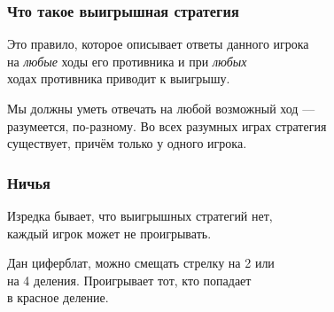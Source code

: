 \begin{frame} \frametitle{Что такое выигрышная стратегия}
	Это правило, которое описывает ответы данного игрока \\
	на {\it любые} ходы его противника и при {\it любых} \\
	ходах противника приводит к выигрышу. \bigskip
	
	Мы должны уметь отвечать на любой возможный ход — \\
	разумеется, по-разному. Во всех разумных играх стратегия \\
	существует, причём только у одного игрока.
\end{frame}

\begin{frame} \frametitle{Ничья}
	Изредка бывает, что выигрышных стратегий нет, \\
	каждый игрок может не проигрывать. \medskip

\begin{center}  \end{center} \medskip

	Дан циферблат, можно смещать стрелку на 2 или\\
	на 4 деления. Проигрывает тот, кто попадает\\
	в красное деление.
\end{frame}
